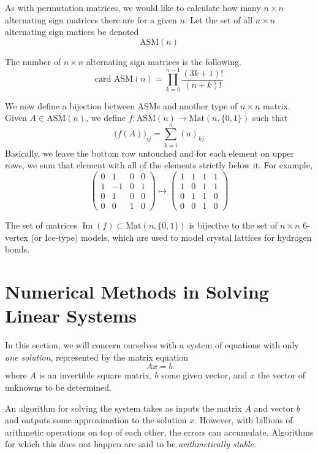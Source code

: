 \documentclass{article}
\DeclareMathOperator{\im}{Im}
\begin{document}
    As with permutation matrices, we would like to calculate how many $n \times n$ alternating sign matrices there are for a given $n$. Let the set of all $n \times n$ alternating sign matices be denoted
    \[\text{ASM}(n)\]

    \begin{proposition}
    The number of $n \times n$ alternating sign matrices is the following. 
    \[\text{card ASM}(n) = \prod_{k=0}^{n-1} \frac{(3k+1)!}{(n+k)!}\]
    \end{proposition}

    We now define a bijection between ASMs and another type of $n \times n$ matrix. Given $A \in \text{ASM}(n)$, we define $f: \text{ASM}(n) \longrightarrow \text{Mat}(n, \{0,1\})$ such that
    \[\big(f(A)\big)_{ij} = \sum_{k=i}^n (a)_{kj}\]
    Basically, we leave the bottom row untouched and for each element on upper rows, we sum that element with all of the elements strictly below it. For example, 
    \[\begin{pmatrix}
    0&1&0&0\\1&-1&0&1\\0&1&0&0\\0&0&1&0
    \end{pmatrix} \mapsto \begin{pmatrix}
    1&1&1&1\\1&0&1&1\\0&1&1&0\\0&0&1&0
    \end{pmatrix}\]

    \begin{theorem}
    The set of matrices $\im(f) \subset \text{Mat}(n, \{0, 1\})$ is bijective to the set of $n \times n$ 6-vertex (or Ice-type) models, which are used to model crystal lattices for hydrogen bonds. 
    \end{theorem}

\section{Numerical Methods in Solving Linear Systems}

  In this section, we will concern ourselves with a system of equations with only \textit{one solution}, represented by the matrix equation
  \[A x = b\]
  where $A$ is an invertible square matrix, $b$ some given vector, and $x$ the vector of unknowns to be determined. 

  An algorithm for solving the system takes as inputs the matrix $A$ and vector $b$ and outputs some approximation to the solution $x$. However, with billions of arithmetic operations on top of each other, the errors can accumulate. Algorithms for which this does not happen are said to be \textit{arithmetically stable}. 
\end{document}
